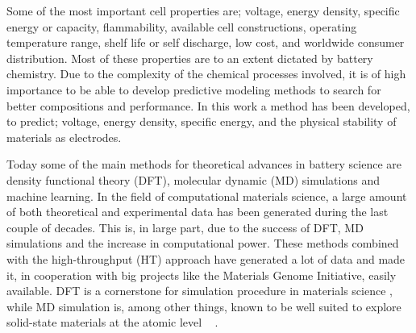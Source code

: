 Some of the most important cell properties are; voltage, energy density, specific energy or capacity, flammability, available cell constructions, operating temperature range, shelf life or self discharge, low cost, and worldwide consumer distribution. Most of these properties are to an extent dictated by battery chemistry. Due to the complexity of the chemical processes involved, it is of high importance to be able to develop predictive modeling methods to search for better compositions and performance. In this work a method has been developed, to predict; voltage, energy density, specific energy, and the physical stability of materials as electrodes.





Today some of the main methods for theoretical advances in battery science are density functional theory (\ac{DFT}), molecular dynamic (\ac{MD}) simulations and machine learning. In the field of computational materials science, a large amount of both theoretical and experimental data has been generated during the last couple of decades. This is, in large part, due to the success of DFT, MD simulations and the increase in computational power. These methods combined with the high-throughput (\ac{HT}) approach have generated a lot of data and made it, in cooperation with big projects like the Materials Genome Initiative, easily available. DFT is a cornerstone for simulation procedure in materials science \cite{schleder2019dft} \cite{pour2011structural} \cite{kirklin2013high}, while MD simulation is, among other things, known to be well suited to explore solid-state materials at the atomic level \cite{kaneko2003local} \cite{ammundsen1999lattice} \cite{islam2000atomistic} \cite{braithwaite2000computational}. 

